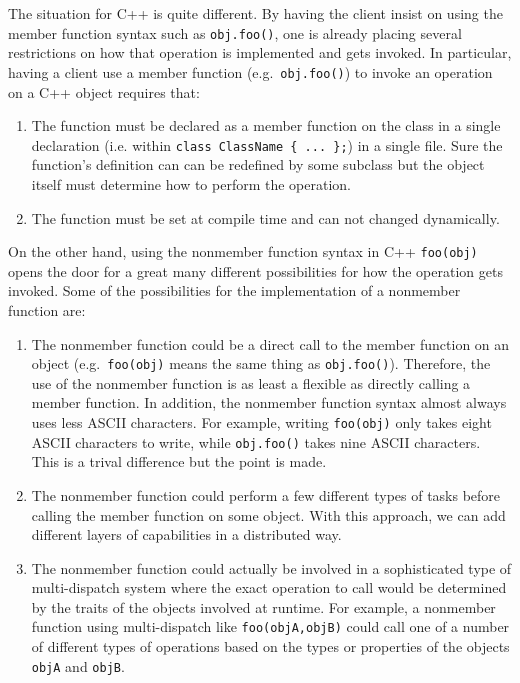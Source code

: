 \documentclass[pdf,ps2pdf,11pt]{SANDreport}
\begin{document}
The situation for C++ is quite different.  By having the client insist on
using the member function syntax such as {}\texttt{obj.foo()}, one is already
placing several restrictions on how that operation is implemented and gets
invoked.  In particular, having a client use a member function (e.g.\
{}\texttt{obj.foo()}) to invoke an operation on a C++ object requires that:

\begin{enumerate}

{}\item{}The function must be declared as a member function on the class in a
single declaration (i.e. within {}\texttt{class ClassName \{ ... \};}) in a
single file.  Sure the function's definition can can be redefined by some
subclass but the object itself must determine how to perform the operation.

{}\item{}The function must be set at compile time and can not changed
dynamically.

\end{enumerate}

On the other hand, using the nonmember function syntax in C++
{}\texttt{foo(obj)} opens the door for a great many different possibilities
for how the operation gets invoked.  Some of the possibilities for the
implementation of a nonmember function are:

\begin{enumerate}

{}\item{}The nonmember function could be a direct call to the member function
on an object (e.g.\ {}\texttt{foo(obj)} means the same thing as
{}\texttt{obj.foo()}).  Therefore, the use of the nonmember function is as
least a flexible as directly calling a member function.  In addition, the
nonmember function syntax almost always uses less ASCII characters.  For
example, writing {}\texttt{foo(obj)} only takes eight ASCII characters to
write, while {}\texttt{obj.foo()} takes nine ASCII characters.  This is a
trival difference but the point is made.

{}\item{}The nonmember function could perform a few different types of tasks
before calling the member function on some object.  With this approach, we can
add different layers of capabilities in a distributed way.

{}\item{}The nonmember function could actually be involved in a sophisticated
type of multi-dispatch system where the exact operation to call would be
determined by the traits of the objects involved at runtime.  For example, a
nonmember function using multi-dispatch like {}\texttt{foo(objA,objB)} could
call one of a number of different types of operations based on the types or
properties of the objects {}\texttt{objA} and {}\texttt{objB}.

\end{enumerate}
\end{document}
